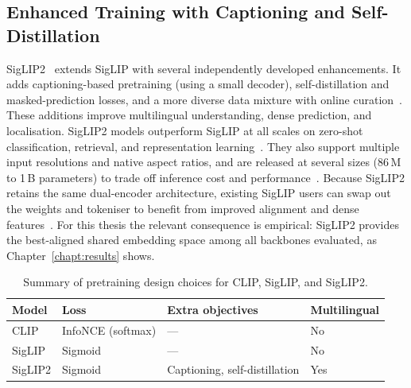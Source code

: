 \subsection{Enhanced Training with Captioning and Self-Distillation}

SigLIP2~\cite{tschannen2025siglip2} extends SigLIP with several independently
developed enhancements. It adds captioning-based pretraining (using a small
decoder), self-distillation and masked-prediction losses, and a more diverse
data mixture with online curation~\cite{tschannen2025siglip2}. These additions improve multilingual
understanding, dense prediction, and localisation. SigLIP2 models outperform
SigLIP at all scales on zero-shot classification, retrieval, and representation
learning~\cite{tschannen2025siglip2}. They also support multiple input
resolutions and native aspect ratios, and are released at several sizes (86\,M
to 1\,B parameters) to trade off inference cost and
performance~\cite{tschannen2025siglip2}. Because SigLIP2 retains the same
dual-encoder architecture, existing SigLIP users can swap out the weights and
tokeniser to benefit from improved alignment and dense
features~\cite{tschannen2025siglip2}. For this thesis the relevant consequence
is empirical: SigLIP2 provides the best-aligned shared embedding space among all
backbones evaluated, as Chapter~\ref{chapt:results} shows.

\begin{table}[t]
  \centering
  \begin{tabular}{llll}
    \toprule
    Model    & Loss              & Extra objectives                     & Multilingual \\
    \midrule
    CLIP     & InfoNCE (softmax) & ---                                  & No           \\
    SigLIP   & Sigmoid           & ---                                  & No           \\
    SigLIP2  & Sigmoid           & Captioning, self-distillation        & Yes          \\
    \bottomrule
  \end{tabular}
  \caption{Summary of pretraining design choices for CLIP, SigLIP, and
    SigLIP2.}\label{tab:bg_models}
\end{table}

